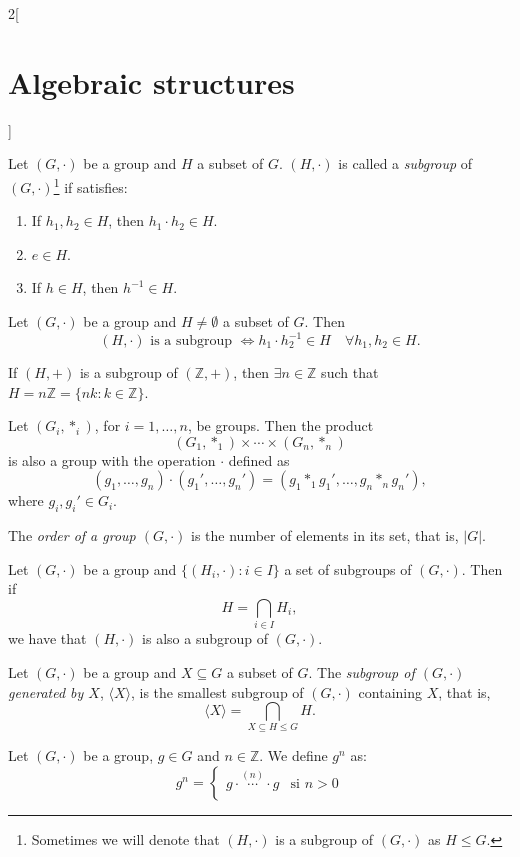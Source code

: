 \documentclass[class=article,10pt,crop=false]{standalone}
\begin{document}
\begin{multicols}{2}[\section{Algebraic structures}]
\begin{definition}[Subgroup]
Let $(G,\cdot)$ be a group and $H$ a subset of $G$. $(H,\cdot)$ is called a \textit{subgroup} of $(G,\cdot)$\footnote{Sometimes we will denote that $(H,\cdot)$ is a subgroup of $(G,\cdot)$ as $H\leq G$.} if satisfies:
\begin{enumerate}
    \item If $h_1,h_2\in H$, then $h_1\cdot h_2\in H$.
    \item $e\in H$.
    \item If $h\in H$, then $h^{-1}\in H$.
\end{enumerate}
\end{definition}
\begin{prop}
Let $(G,\cdot)$ be a group and $H\ne\emptyset$ a subset of $G$. Then $$(H,\cdot)\text{ is a subgroup }\iff h_1\cdot h_2^{-1}\in H\quad\forall h_1,h_2\in H.$$
\end{prop}
\begin{prop}
If $(H,+)$ is a subgroup of $(\mathbb{Z},+)$, then $\exists n\in\mathbb{Z}$ such that $H=n\mathbb{Z}=\{nk:k\in\mathbb{Z}\}$.
\end{prop}
\begin{prop}
Let $(G_i,*_i)$, for $i=1,\ldots, n$, be groups. Then the product $$(G_1,*_1)\times\cdots\times(G_n,*_n)$$ is also a group with the operation $\cdot$ defined as $$(g_1,\ldots,g_n)\cdot(g_1',\ldots,g_n')=(g_1*_1g_1',\ldots,g_n*_ng_n'),$$ where $g_i,g_i'\in G_i$.
\end{prop}
\begin{definition}
The \textit{order of a group $(G,\cdot)$} is the number of elements in its set, that is, $|G|$.
\end{definition}
\begin{lemma}
Let $(G,\cdot)$ be a group and $\{(H_i,\cdot):i\in I\}$ a set of subgroups of $(G,\cdot)$. Then if $$H=\displaystyle\bigcap_{i\in I}H_i,$$ we have that $(H,\cdot)$ is also a subgroup of $(G,\cdot)$.
\end{lemma}
\begin{definition}
Let $(G,\cdot)$ be a group and $X\subseteq G$ a subset of $G$. The \textit{subgroup of $(G,\cdot)$ generated by $X$}, $\langle X\rangle$, is the smallest subgroup of $(G,\cdot)$ containing $X$, that is, $$\langle X\rangle=\bigcap_{X\subseteq H\leq G}H.$$
\end{definition}
\begin{definition}
Let $(G,\cdot)$ be a group, $g\in G$ and $n\in\mathbb{Z}$. We define $g^n$ as: $$g^n=\left\{\begin{array}{ll}
    g\cdot\overset{(n)}{\cdots}\cdot g & \text{si }n>0  \\

\end{array}$$
\end{definition}
\end{multicols}
\end{document}
